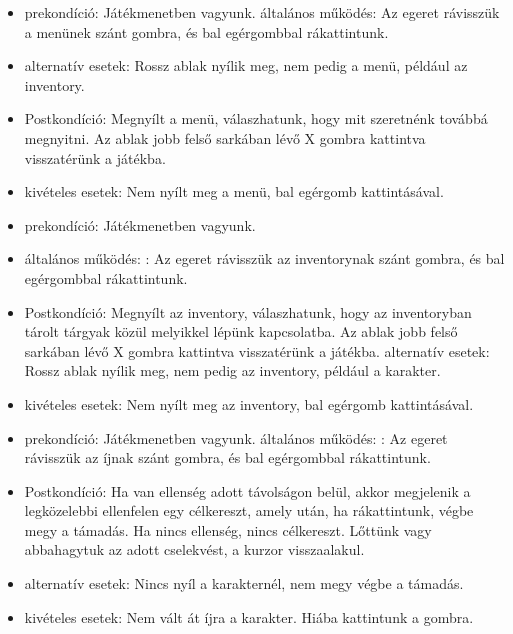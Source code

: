 
\begin{itemize}
    \item prekondíció: Játékmenetben vagyunk.
    általános működés: Az egeret rávisszük a menünek szánt gombra, és bal egérgombbal rákattintunk.
    \item alternatív esetek: Rossz ablak nyílik meg, nem pedig a menü, például az inventory.
    \item Postkondíció: Megnyílt a menü, válaszhatunk, hogy mit szeretnénk továbbá megnyitni. Az ablak jobb felső sarkában lévő X gombra kattintva visszatérünk a játékba.
    \item kivételes esetek: Nem nyílt meg a menü, bal egérgomb kattintásával.
\end{itemize}


\begin{itemize}
    \item prekondíció: Játékmenetben vagyunk.
    \item általános működés: : Az egeret rávisszük az inventorynak szánt gombra, és bal egérgombbal rákattintunk.
    \item Postkondíció: Megnyílt az inventory, válaszhatunk, hogy az inventoryban tárolt tárgyak közül melyikkel lépünk kapcsolatba. Az ablak jobb felső sarkában lévő X gombra kattintva visszatérünk a játékba.
    alternatív esetek: Rossz ablak nyílik meg, nem pedig az inventory, például a karakter.
    \item kivételes esetek: Nem nyílt meg az inventory, bal egérgomb kattintásával.
\end{itemize}


\begin{itemize}
    \item prekondíció: Játékmenetben vagyunk.
    általános működés: : Az egeret rávisszük az íjnak szánt gombra, és bal egérgombbal rákattintunk.
    \item Postkondíció: Ha van ellenség adott távolságon belül, akkor megjelenik a legközelebbi ellenfelen egy célkereszt, amely után, ha rákattintunk, végbe megy a támadás. Ha nincs ellenség, nincs célkereszt.
    Lőttünk vagy abbahagytuk az adott cselekvést, a kurzor visszaalakul.
    \item alternatív esetek: Nincs nyíl a karakternél, nem megy végbe a támadás.
    \item kivételes esetek: Nem vált át íjra a karakter. Hiába kattintunk a gombra.
\end{itemize}

